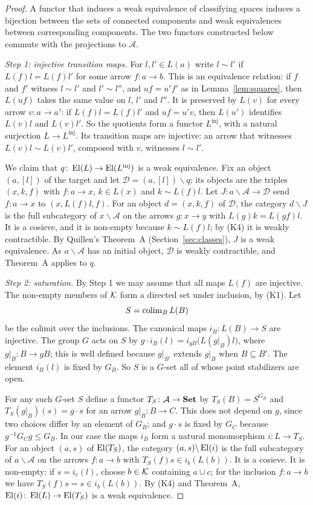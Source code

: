 \begin{proof}
A functor that induces a weak equivalence of classifying spaces induces a
bijection between the sets of connected components and weak equivalences
between corresponding components. The two functors constructed below commute
with the projections to $\mathcal A$.

\emph{Step 1: injective transition maps.} For $l,l'\in L(a)$ write $l\sim l'$
if $L(f)l=L(f)l'$ for some arrow $f\colon a\to b$. This is an equivalence
relation: if $f$ and $f'$ witness $l\sim l'$ and $l'\sim l''$, and $uf=u'f'$ as
in Lemma~\ref{lem:squares}, then $L(uf)$ takes the same value on $l$, $l'$ and
$l''$. It is preserved by $L(v)$ for every arrow $v\colon a\to a'$: if
$L(f)l=L(f)l'$ and $uf=u'v$, then $L(u')$ identifies $L(v)l$ and $L(v)l'$.
So the quotients form a functor $L^{\mathrm{inj}}$, with a natural surjection
$L\to L^{\mathrm{inj}}$. Its transition maps are injective: an arrow that
witnesses $L(v)l\sim L(v)l'$, composed with $v$, witnesses $l\sim l'$.

We claim that $q\colon\operatorname{El}(L)\to\operatorname{El}(L^{\mathrm{inj}})$ is a weak equivalence. Fix
an object $(a,[l])$ of the target and let $\mathcal D=(a,[l])\backslash q$; its
objects are the triples $(x,k,f)$ with $f\colon a\to x$, $k\in L(x)$ and
$k\sim L(f)l$. Let $J\colon a\backslash\mathcal A\to\mathcal D$ send
$f\colon a\to x$ to $(x,L(f)l,f)$. For an object $d=(x,k,f)$ of $\mathcal D$,
the category $d\backslash J$ is the full subcategory of $x\backslash\mathcal A$
on the arrows $g\colon x\to y$ with $L(g)k=L(gf)l$. It is a cosieve, and it is
non-empty because $k\sim L(f)l$; by (K4) it is weakly contractible. By
Quillen's Theorem~A (Section~\ref{sec:classes}), $J$ is a weak equivalence. As
$a\backslash\mathcal A$ has an initial object, $\mathcal D$ is weakly
contractible, and Theorem~A applies to $q$.

\emph{Step 2: saturation.} By Step 1 we may assume that all maps $L(f)$ are
injective. The non-empty members of $\mathcal{K}$ form a directed set under inclusion,
by (K1). Let
\[
 S=\operatorname{colim}_{B}L(B)
\]
be the colimit over the inclusions. The canonical maps $i_B\colon L(B)\to S$
are injective. The group $G$ acts on $S$ by
$g\cdot i_B(l)=i_{gB}\bigl(L(g|_B)l\bigr)$, where $g|_B\colon B\to gB$; this is
well defined because $g|_{B'}$ extends $g|_B$ when $B\subseteq B'$. The element
$i_B(l)$ is fixed by $G_B$. So $S$ is a $G$-set all of whose point stabilizers
are open.

For any such $G$-set $S$ define a functor $T_S\colon\mathcal A\to\mathbf{Set}$ by
$T_S(B)=S^{G_B}$ and $T_S(g|_B)(s)=g\cdot s$ for an arrow $g|_B\colon B\to C$.
This does not depend on $g$, since two choices differ by an element of $G_B$;
and $g\cdot s$ is fixed by $G_C$ because $g^{-1}G_Cg\le G_B$. In our case the
maps $i_B$ form a natural monomorphism $i\colon L\to T_S$. For an object
$(a,s)$ of $\operatorname{El}(T_S)$, the category $(a,s)\backslash\operatorname{El}(i)$ is the full
subcategory of $a\backslash\mathcal A$ on the arrows $f\colon a\to b$ with
$T_S(f)s\in i_b(L(b))$. It is a cosieve. It is non-empty: if $s=i_c(l)$,
choose $b\in\mathcal{K}$ containing $a\cup c$; for the inclusion $f\colon a\to b$ we
have $T_S(f)s=s\in i_b(L(b))$. By (K4) and Theorem~A,
$\operatorname{El}(i)\colon\operatorname{El}(L)\to\operatorname{El}(T_S)$ is a weak equivalence.


\end{proof}
